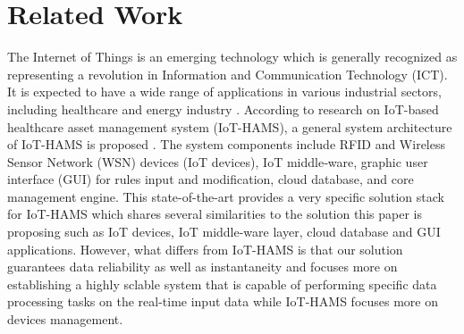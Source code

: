 \documentclass[conference]{IEEEtran}
\begin{document}
\section{Related Work}
The Internet of Things is an emerging technology which is generally recognized as representing a revolution in Information and Communication Technology (ICT). It is expected to have a wide range of applications in various industrial sectors, including healthcare \cite{ref6,ref7} and energy industry \cite{ref8}. According to research on IoT-based healthcare asset management system (IoT-HAMS), a general system architecture of IoT-HAMS is proposed \cite{ref9}. The system components include RFID and Wireless Sensor Network (WSN) devices (IoT devices), IoT middle‐ware, graphic user interface (GUI) for rules input and modification, cloud database, and core management engine. This state-of-the-art provides a very specific solution stack for IoT-HAMS which shares several similarities to the solution this paper is proposing such as IoT devices, IoT middle-ware layer, cloud database and GUI applications. However, what differs from IoT-HAMS is that our solution guarantees data reliability as well as instantaneity and focuses more on establishing a highly sclable system that is capable of performing specific data processing tasks on the real-time input data while IoT-HAMS focuses more on devices management.

\end{document}
